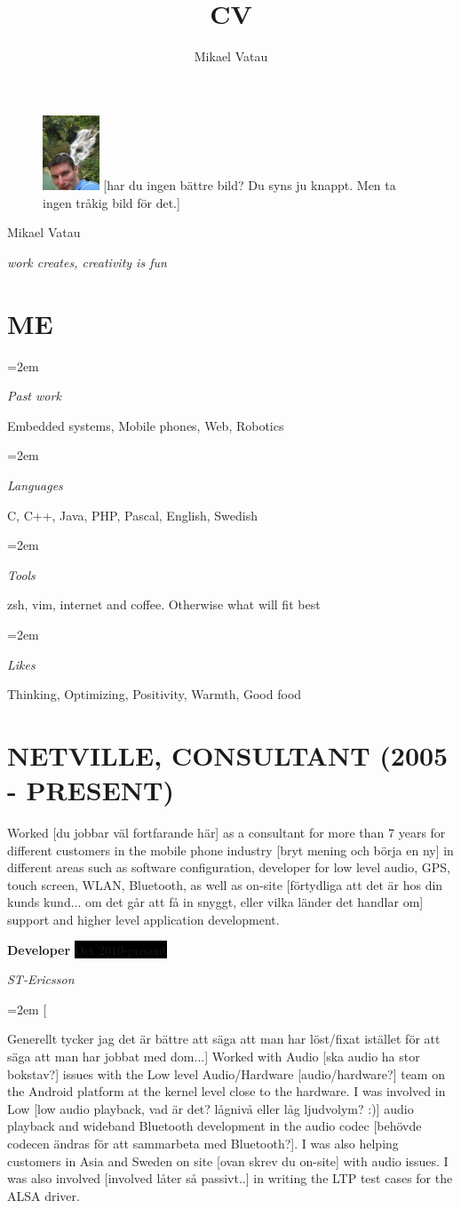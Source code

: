 \documentclass[paper=a4,fontsize=11pt]{scrartcl}
\author{Mikael Vatau}
\title{CV}
\newlength{\spacebox}
\newcommand{\sepspace}{\vspace*{1em}}
\newcommand{\MyName}[1]{
  \Huge \usefont{OT1}{phv}{b}{n} \hfill #1
  \par \normalsize \normalfont}
\newcommand{\MySlogan}[1]{
  \small \usefont{OT1}{phv}{m}{n}\hfill \textit{#1} %
  \par \normalsize \normalfont}
\newcommand{\NewPart}[1]{\section*{\uppercase{#1}}}
\newcommand{\PersonalEntry}[2]{
  \noindent\hangindent=2em\hangafter=0
  \parbox{\spacebox}{
    \textit{#1}}
    \hspace{1.5em} #2 \par}
\newcommand{\EducationEntry}[4]{
		\noindent \textbf{#1} \hfill 					%
		\colorbox{Black}{%
			\parbox{6em}{%
			\hfill\color{White}#2}} \par				%
		\noindent \textit{#3} \par					%
		\noindent\hangindent=2em\hangafter=0 \small #4 	%
		\normalsize \par}
\newcommand{\WorkEntry}[4]{						%
		\noindent \textbf{#1} \hfill 					%
		\colorbox{Black}{\color{White}#2} \par		%
		\noindent \textit{#3} \par					%
		\noindent\hangindent=2em\hangafter=0 \small #4 	%
		\normalsize \par}
\begin{document}
\begin{figure}
	\vspace*{-2em}
		\includegraphics[width=0.15\textwidth,natwidth=180,natheight=180]{mesmall.jpeg} [har du ingen bättre bild? Du syns ju knappt. Men ta ingen tråkig bild för det.]
\end{figure}

\MyName{Mikael Vatau}
\MySlogan{work creates, creativity is fun} %

\sepspace

\NewPart{Me} %
\PersonalEntry{Past work}{Embedded systems, Mobile phones, Web, Robotics}
\PersonalEntry{Languages}{C, C++, Java, PHP, Pascal, English, Swedish}
\PersonalEntry{Tools}{zsh, vim, internet and coffee. Otherwise what will fit best}
\PersonalEntry{Likes}{Thinking, Optimizing, Positivity, Warmth, Good food}

\NewPart{Netville, consultant (2005 - present)}{Worked [du jobbar väl fortfarande här] as a consultant for more than 
  7 years for different customers in the mobile phone industry [bryt mening och börja en ny] in different areas such 
  as software configuration, developer for low level audio, GPS, touch screen, WLAN, 
  Bluetooth, as well as on-site [förtydliga att det är hos din kunds kund... om det går att få in snyggt, eller vilka länder det handlar om] support and higher level application development.}
\sepspace

\WorkEntry{Developer}{Oct 2010-present}{ST-Ericsson}
[Generellt tycker jag det är bättre att säga att man har löst/fixat istället för att säga att man har jobbat med dom...]
  {Worked with Audio [ska audio ha stor bokstav?] issues with the Low level Audio/Hardware [audio/hardware?] team on the Android platform 
  at the kernel level close to the hardware. I was involved in Low [low audio playback, vad är det? lågnivå eller låg ljudvolym? :)] audio playback and  
  wideband Bluetooth development in the audio codec [behövde codecen ändras för att sammarbeta med Bluetooth?]. I was also helping customers in Asia 
  and Sweden on site [ovan skrev du on-site] with audio issues. I was also involved [involved låter så passivt..] in writing the LTP test cases for 
  the ALSA driver.}
\sepspace
\end{document}
